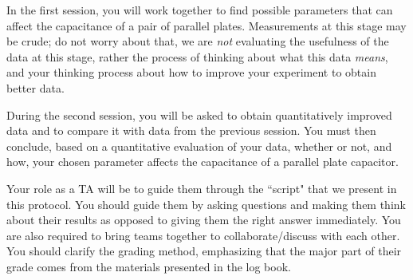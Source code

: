 \documentclass[12pt]{report}
\begin{document}
In the first session, you will work together to find possible parameters that can affect the capacitance of a pair of parallel plates. Measurements at this stage may be crude; do not worry about that, we are {\it not} evaluating the usefulness of the data at this stage, rather the process of thinking about what this data {\it means}, and your thinking process about how to improve your experiment to obtain better data.

During the second session, you will be asked to obtain quantitatively improved data and to compare it with data from the previous session. You must then conclude, based on a quantitative evaluation of your data, whether or not, and how, your chosen parameter affects the capacitance of a parallel plate capacitor. \\

\begin{tcolorbox}[title=Role as a TA]
Your role as a TA will be to guide them through the ``script" that we present in this protocol. You should guide them by asking questions and making them think about their results as opposed to giving them the right answer immediately. You are also required to bring teams together to collaborate/discuss with each other. You should clarify the grading method,  emphasizing that the major part of their grade comes from the materials presented in the log book.
\end{tcolorbox}
\end{document}
